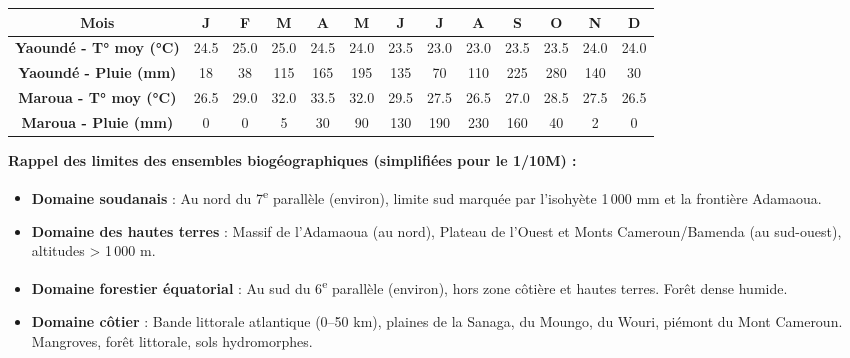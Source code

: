 \documentclass[11pt]{article}
\begin{document}
\begin{center}
\begin{tabular}{|c|cccccccccccc|}\hline
\rowcolor{popblueL}
\textbf{Mois} & \textbf{J} & \textbf{F} & \textbf{M} & \textbf{A} & \textbf{M} & \textbf{J} & \textbf{J} & \textbf{A} & \textbf{S} & \textbf{O} & \textbf{N} & \textbf{D} \\ \hline
\textbf{Yaoundé - T° moy (°C)} & 24.5 & 25.0 & 25.0 & 24.5 & 24.0 & 23.5 & 23.0 & 23.0 & 23.5 & 23.5 & 24.0 & 24.0 \\ \hline
\textbf{Yaoundé - Pluie (mm)} & 18 & 38 & 115 & 165 & 195 & 135 & 70 & 110 & 225 & 280 & 140 & 30 \\ \hline
\textbf{Maroua - T° moy (°C)} & 26.5 & 29.0 & 32.0 & 33.5 & 32.0 & 29.5 & 27.5 & 26.5 & 27.0 & 28.5 & 27.5 & 26.5 \\ \hline
\textbf{Maroua - Pluie (mm)} & 0 & 0 & 5 & 30 & 90 & 130 & 190 & 230 & 160 & 40 & 2 & 0 \\ \hline
\end{tabular}
\end{center}

\medskip
\textbf{Rappel des limites des ensembles biogéographiques (simplifiées pour le 1/10M) :}
\begin{itemize}
    \item \textbf{Domaine soudanais} : Au nord du 7\textsuperscript{e} parallèle (environ), limite sud marquée par l'isohyète 1\,000 mm et la frontière Adamaoua.
    \item \textbf{Domaine des hautes terres} : Massif de l'Adamaoua (au nord), Plateau de l'Ouest et Monts Cameroun/Bamenda (au sud-ouest), altitudes > 1\,000 m.
    \item \textbf{Domaine forestier équatorial} : Au sud du 6\textsuperscript{e} parallèle (environ), hors zone côtière et hautes terres. Forêt dense humide.
    \item \textbf{Domaine côtier} : Bande littorale atlantique (0--50 km), plaines de la Sanaga, du Moungo, du Wouri, piémont du Mont Cameroun. Mangroves, forêt littorale, sols hydromorphes.
\end{itemize}
\end{document}
